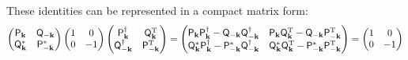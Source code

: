 \documentclass[aps, prx, nofootinbib, superscriptaddress]{revtex4-2}
\newcommand{\kvec}{\mathbf{k}}
\begin{document}
These identities can be represented in a compact matrix form:
\begin{equation}
    \begin{pmatrix}
       \mathsf{P}_{\kvec} & \mathsf{Q}_{-\kvec} \\ 
       \mathsf{Q}_{\kvec}^{*} & \mathsf{P}_{-\kvec}^{*}
    \end{pmatrix}
    \begin{pmatrix}
        1 & 0 \\ 0 & -1
    \end{pmatrix}
    \begin{pmatrix}
       \mathsf{P}_{\kvec}^{\dagger} & \mathsf{Q}_{\kvec}^{\rm T} \\ 
       \mathsf{Q}_{-\kvec}^{\dagger} & \mathsf{P}_{-\kvec}^{\rm T}
    \end{pmatrix} 
    = 
    \begin{pmatrix} 
        \mathsf{P}_{\kvec}\mathsf{P}_{\kvec}^{\dagger} - \mathsf{Q}_{-\kvec}\mathsf{Q}_{-\kvec}^{\dagger} & 
        \mathsf{P}_{\kvec}\mathsf{Q}_{\kvec}^{\rm T}   - \mathsf{Q}_{-\kvec}\mathsf{P}_{-\kvec}^{\rm T}     \\
        \mathsf{Q}_{\kvec}^{*}\mathsf{P}_{\kvec}^{\dagger} - \mathsf{P}_{-\kvec}^{*}\mathsf{Q}_{-\kvec}^{\dagger} & 
            \mathsf{Q}_{\kvec}^{*}\mathsf{Q}_{\kvec}^{\rm T} - \mathsf{P}_{-\kvec}^{*}\mathsf{P}_{-\kvec}^{\rm T}
    \end{pmatrix}
    = 
    \begin{pmatrix}
        1 & 0 \\ 0 & -1
    \end{pmatrix}
\end{equation}
\end{document}
